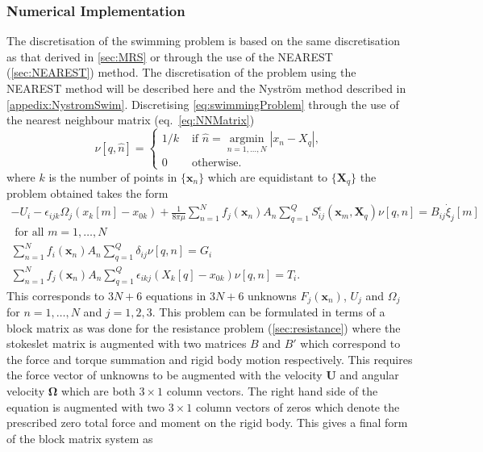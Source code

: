 \subsubsection{Numerical Implementation}
The discretisation of the swimming problem is based on the same discretisation as that derived in \cref{sec:MRS} or through the use of the NEAREST (\cref{sec:NEAREST}) method. The discretisation of the problem using the NEAREST method will be described here and the Nyström method described in \cref{appedix:NystromSwim}. Discretising \cref{eq:swimmingProblem} through the use of the nearest neighbour matrix (eq.~\ref{eq:NNMatrix})
\begin{equation*}
    \nu [q, \hat{n}]= \begin{cases} 1/k & \text { if } \hat{n}=\underset{n=1, \ldots, N}{\operatorname{argmin}}|x_n-X_q| , \\ 0 & \text { otherwise. }\end{cases}
\end{equation*}
where $k$ is the number of points in $\{\bm{x}_n\}$ which are equidistant to $\{\bm{X}_q\}$ the problem obtained takes the form
\begin{equation*}
\begin{gathered}
    -U_{i}-\epsilon_{i j k} \Omega_{j}\left(x_k[{m}]-x_{0 k}\right)+\frac{1}{8 \pi\mu} \sum_{n=1}^N f_{j}(\bm{x}_n) A_n \sum_{q=1}^Q S_{i j}^{\epsilon}(\bm{x}_m, \bm{X}_q)\nu [q, n]  =  B_{i j} \dot{\xi}_{j}[m] \\ \text { for all } m = 1,\dots,N\\
    \sum_{n=1}^N f_{i}(\bm{x}_n) A_n \sum_{q=1}^Q \delta_{i j}\nu [q, n]= G_i \\
    \sum_{n=1}^N f_{j}(\bm{x}_n) A_n \sum_{q=1}^Q \epsilon_{i k j} (X_{k}[q]-x_{0 k}) \nu [q, n] = T_i.
\end{gathered}
\end{equation*}
This corresponds to $3N + 6$ equations in $3N + 6$ unknowns $F_j(\bm{x}_n)$, $U_j$ and $\Omega_j$ for $n=1,\dots,N$ and $j=1,2,3$.
This problem can be formulated in terms of a block matrix as was done for the resistance problem (\cref{sec:resistance}) where the stokeslet matrix is augmented with two matrices $B$ and $B'$ which correspond to the force and torque summation and rigid body motion respectively. This requires the force vector of unknowns to be augmented with the velocity $\boldsymbol{U}$ and angular velocity $\boldsymbol{\Omega}$ which are both $3 \times 1$ column vectors. The right hand side of the equation is augmented with two $3 \times 1$ column vectors of zeros which denote the prescribed zero total force and moment on the rigid body. This gives a final form of the block matrix system as

